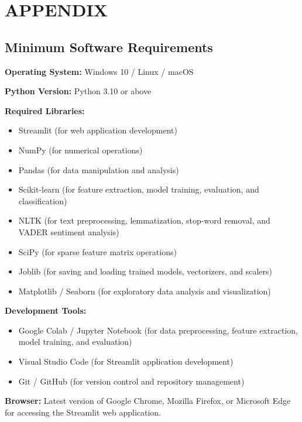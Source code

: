 \documentclass[12pt,a4paper]{report}
\begin{document}
\newpage

\chapter{APPENDIX}

\section{Minimum Software Requirements}

\noindent
\textbf{Operating System:} Windows 10 / Linux / macOS

\noindent
\textbf{Python Version:} Python 3.10 or above

\vspace{0.3cm}

\noindent
\textbf{Required Libraries:}

\begin{itemize}
    \item Streamlit (for web application development)
    \item NumPy (for numerical operations)
    \item Pandas (for data manipulation and analysis)
    \item Scikit-learn (for feature extraction, model training,
    evaluation, and classification)
    \item NLTK (for text preprocessing, lemmatization,
    stop-word removal, and VADER sentiment analysis)
    \item SciPy (for sparse feature matrix operations)
    \item Joblib (for saving and loading trained models,
    vectorizers, and scalers)
    \item Matplotlib / Seaborn (for exploratory data analysis
    and visualization)
\end{itemize}

\noindent
\textbf{Development Tools:}

\begin{itemize}
    \item Google Colab / Jupyter Notebook (for data preprocessing,
    feature extraction, model training, and evaluation)
    \item Visual Studio Code (for Streamlit application development)
    \item Git / GitHub (for version control and repository management)
\end{itemize}

\noindent
\textbf{Browser:} Latest version of Google Chrome, Mozilla Firefox,
or Microsoft Edge for accessing the Streamlit web application.
\end{document}
